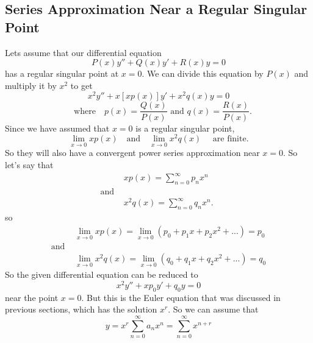 \documentclass[font =22]{report}
\begin{document}
  \subsection{Series Approximation Near a Regular Singular Point}
  Lets assume that our differential equation 
  \[
  P(x)y'' + Q(x)y' + R(x) y = 0
  \]
  has a regular singular point at $x = 0$. We can divide this equation by $P(x)$ and multiply it by $x^2$ to get 
  \[
  x^2y''+x[xp(x)]y'+x^2q(x)y = 0 
  \]
  \[\quad \text{where} \quad p(x) =  \frac{Q(x)}{P(x)} \text{ and } q(x) =   \frac{R(x)}{P(x)}.
  \]
  Since we have assumed that $x= 0$ is a regular singular point, 
 \[
 \lim_{x \to 0} xp(x) \quad \text{and} \quad \lim_{x \to 0} x^2q(x) \quad \text{ are finite.}
 \]
 So they will also have a convergent power series approximation near $x=0$. So let's say that 
 \begin{align*}
 &xp(x) = \sum_{n=0}^\infty p_n x^n \quad \\
 \text{and }\\
 &x^2q(x) = \sum_{n=0}^\infty q_n x^n. 
 \end{align*}
 so 
 \begin{align*}
 &\lim_{x \to 0}xp(x) = \lim_{x \to 0} (p_0 +p_1x+p_2x^2+...) = p_0  \\
 \text{and }\\
 &\lim_{x \to 0}x^2q(x) = \lim_{x \to 0} (q_0 +q_1x+q_2x^2+...) = q_0
\end{align*} 
So the given differential equation can be reduced to 
\[
x^2y''+xp_0y'+q_0y = 0  
\]
near the point $x=0$.  But this is the Euler equation that was discussed in previous sections, which has the solution $x^r$. So we can assume that 
\[
y = x^r \sum_{n=0}^\infty a_nx^n = \sum_{n=0}^\infty x^{n+r}
\]
\end{document}
